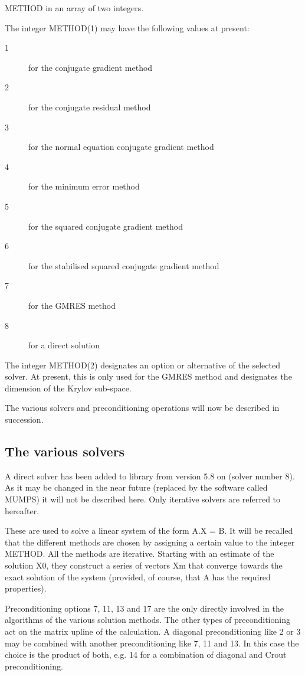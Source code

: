 METHOD in an array of two integers.

The integer METHOD(1) may have the following values at present:
\begin{description}
  \item [1] for the conjugate gradient method
  \item [2] for the conjugate residual method
  \item [3] for the normal equation conjugate gradient method
  \item [4] for the minimum error method
  \item [5] for the squared conjugate gradient method
  \item [6] for the stabilised squared conjugate gradient method
  \item [7] for the GMRES method
  \item [8] for a direct solution
\end{description}

The integer METHOD(2) designates an option or alternative of the selected
solver. At present, this is only used for the GMRES method and designates the
dimension of the Krylov sub-space.

The various solvers and preconditioning operations will now be described in
succession.

\subsection{The various solvers}

A direct solver has been added to library \bief from version 5.8 on (solver
number 8). As it may be changed in the near future (replaced by the software
called MUMPS) it will not be described here. Only iterative solvers are
referred to hereafter.

These are used to solve a linear system of the form A.X = B. It will be
recalled that the different methods are chosen by assigning a certain value to
the integer METHOD. All the  methods are iterative. Starting with an estimate
of the solution X0, they construct a series of vectors Xm that converge towards
the exact solution of the system (provided, of course, that A has the required
properties).

Preconditioning options 7, 11, 13 and 17 are the only directly involved in the
algorithms of the various solution methods. The other types of preconditioning
act on the matrix upline of the calculation. A diagonal preconditioning like 2
or 3 may be combined with another preconditioning like 7, 11 and 13. In this
case the choice is the product of both, e.g. 14 for a combination of diagonal
and Crout preconditioning.

